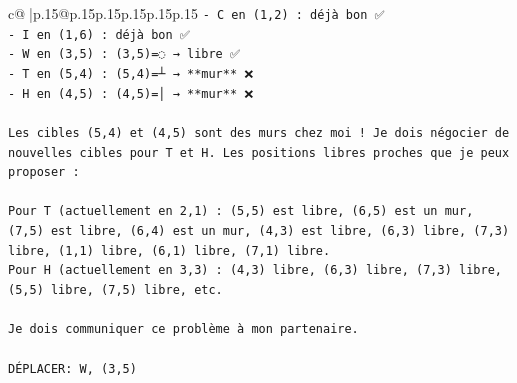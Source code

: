 \documentclass{article}
\begin{document}
{\begin{supertabular}{c@{$\;$}|p{.15\linewidth}@{}p{.15\linewidth}p{.15\linewidth}p{.15\linewidth}p{.15\linewidth}p{.15\linewidth}}
{{{\texttt{{-} C en (1,2) : déjà bon ✅} \\
\texttt{{-} I en (1,6) : déjà bon ✅} \\
\texttt{{-} W en (3,5) : (3,5)=◌ → libre ✅} \\
\texttt{{-} T en (5,4) : (5,4)=┴ → **mur** ❌} \\
\texttt{{-} H en (4,5) : (4,5)=│ → **mur** ❌} \\
\\ 
\texttt{Les cibles (5,4) et (4,5) sont des murs chez moi ! Je dois négocier de nouvelles cibles pour T et H. Les positions libres proches que je peux proposer :} \\
\\ 
\texttt{Pour T (actuellement en 2,1) : (5,5) est libre, (6,5) est un mur, (7,5) est libre, (6,4) est un mur, (4,3) est libre, (6,3) libre, (7,3) libre, (1,1) libre, (6,1) libre, (7,1) libre.} \\
\texttt{Pour H (actuellement en 3,3) : (4,3) libre, (6,3) libre, (7,3) libre, (5,5) libre, (7,5) libre, etc.} \\
\\ 
\texttt{Je dois communiquer ce problème à mon partenaire.} \\
\\ 
\texttt{DÉPLACER: W, (3,5)} \\
            }
        }
    }
     \\ \\


\end{supertabular}}
\end{document}
